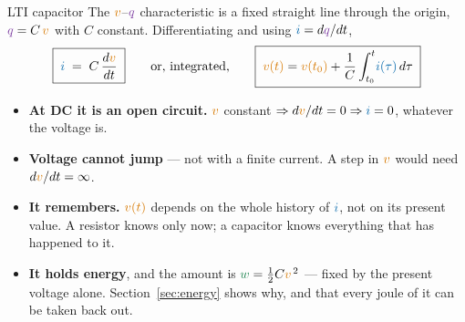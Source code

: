 \documentclass[11pt,a4paper]{article}
\newcommand{\Icol}[1]{\textcolor{ccur}{#1}}
\newcommand{\Vcol}[1]{\textcolor{cvolt}{#1}}
\newcommand{\Pcol}[1]{\textcolor{cpow}{#1}}
\newcommand{\Qcol}[1]{\textcolor{ccharge}{#1}}
\begin{document}
\begin{definitionbox}{LTI capacitor}
The $\Vcol{v}$--$\Qcol{q}$ characteristic is a fixed straight line through the origin,
$\Qcol{q} = C\,\Vcol{v}$ with $C$ constant. Differentiating and using
$\Icol{i} = d\Qcol{q}/dt$,
\[
  \boxed{\;\Icol{i} \;=\; C\,\frac{d\Vcol{v}}{dt}\;}
  \qquad\text{or, integrated,}\qquad
  \boxed{\;\Vcol{v(t)} = \Vcol{v(t_0)} + \frac{1}{C}\int_{t_0}^{t}\!\Icol{i(\tau)}\,d\tau\;}
\]
\end{definitionbox}

\begin{center}
\end{center}
\vspace{2pt}

\begin{ideabox}
\begin{itemize}
  \item \textbf{At DC it is an open circuit.} $\Vcol{v}$ constant $\Rightarrow
        d\Vcol{v}/dt = 0 \Rightarrow \Icol{i} = 0$, whatever the voltage is.
  \item \textbf{Voltage cannot jump} --- not with a finite current. A step in $\Vcol{v}$
        would need $d\Vcol{v}/dt = \infty$.
  \item \textbf{It remembers.} $\Vcol{v(t)}$ depends on the whole history of $\Icol{i}$,
        not on its present value. A resistor knows only now; a capacitor knows everything
        that has happened to it.
  \item \textbf{It holds energy}, and the amount is $\Pcol{w} = \tfrac12 C\Vcol{v}^{\,2}$
        --- fixed by the present voltage alone. Section~\ref{sec:energy} shows why, and
        that every joule of it can be taken back out.
\end{itemize}
\end{ideabox}
\end{document}
